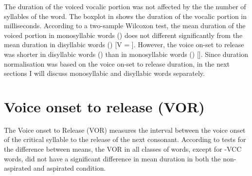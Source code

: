 \documentclass[11pt,a4paper,openany]{memoir}\usepackage[]{graphicx}\usepackage[]{color}
\begin{document}
The duration of the voiced vocalic portion was not affected by the the number of syllables of the word.
The boxplot in  shows the duration of the vocalic portion in milliseconds.
According to a two-sample Wilcoxon test, the mean duration of the voiced portion in monosyllabic words () does not different significantly from the mean duration in disyllabic words () [V = ].
However, the voice on-set to release was shorter in disyllabic words () than in monosyllabic words () [].
Since duration normalisation was based on the voice on-set to release duration, in the next sections I will discuss monosyllabic and disyllabic words separately.

\section{Voice onset to release (VOR)}



The Voice onset to Release (VOR) measures the interval between the voice onset of the critical syllable to the release of the next consonant.
According to tests for the difference between means, the VOR in all classes of words, except for -VCC words, did not have a significant difference in mean duration in both the non-aspirated and aspirated condition.

\end{document}
